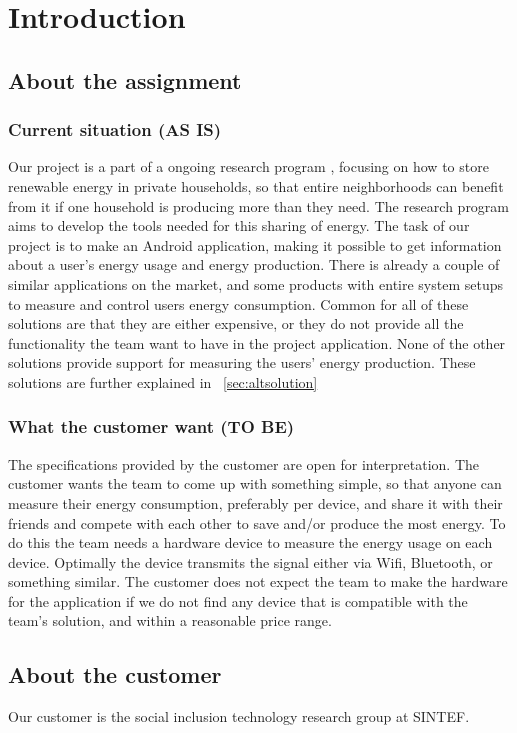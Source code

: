 \chapter{Introduction}

\section{About the assignment}
\subsection{Current situation (AS IS)}
Our project is a part of a ongoing research program \cite{cossmic}, focusing on how to store renewable energy in private households, so that entire neighborhoods can benefit from it if one household is producing more than they need. The research program aims to develop the tools needed for this sharing of energy. The task of our project is to make an Android application, making it possible to get information about a user's energy usage and energy production. There is already a couple of similar applications on the market, and some products with entire system setups to measure and control users energy consumption. Common for all of these solutions are that they are either expensive, or they do not provide all the functionality the team want to have in the project application. None of the other solutions provide support for measuring the users' energy production. These solutions are further explained in ~\ref{sec:altsolution}

\subsection{What the customer want (TO BE)}
The specifications provided by the customer are open for interpretation. The customer wants the team to come up with something simple, so that anyone can measure their energy consumption, preferably per device, and share it with their friends and compete with each other to save and/or produce the most energy. To do this the team needs a hardware device to measure the energy usage on each device. Optimally the device transmits the signal either via Wifi, Bluetooth, or something similar. The customer does not expect the team to make the hardware for the application if we do not find any device that is compatible with the team's solution, and within a reasonable price range.

\section{About the customer}

Our customer is the social inclusion technology research group at SINTEF. \cite{sintef}








 



